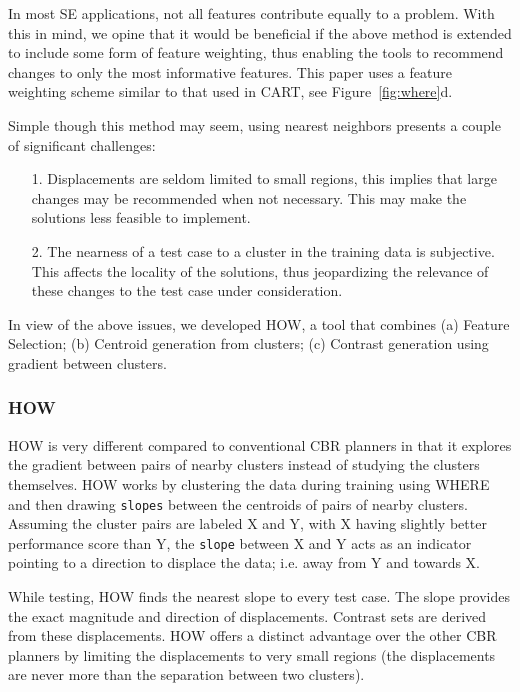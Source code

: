 \documentclass{sig-alternate}
\newcommand{\fig}[1]{Figure~\ref{fig:#1}}
\begin{document}
In most SE applications, not all features contribute equally to a problem. With this in mind, we opine that it would be beneficial if the above method is extended to include some form of feature weighting, thus enabling the tools to recommend changes to only the most informative features. This paper uses a feature weighting scheme similar to that used in CART, see \fig{where}d.

Simple though this method may seem, using nearest neighbors presents a couple of significant challenges: 
\begin{itemize}
\item[1.] Displacements are seldom limited to small regions, this implies that large changes may be recommended when not necessary. This may make the solutions less feasible to implement. 
\item[2.] The nearness of a test case to a cluster in the training data is subjective. This affects the locality of the solutions, thus jeopardizing the relevance of these changes to the test case under consideration.
\end{itemize}

In view of the above issues, we developed HOW, a tool that combines (a) Feature Selection; (b) Centroid generation from clusters; (c) Contrast generation using gradient between clusters.

\subsubsection{HOW}

HOW is very different compared to conventional CBR planners in that it explores the gradient between pairs of nearby clusters instead of studying the clusters themselves. HOW works by clustering the data during training using WHERE and then drawing \texttt{slopes} between the centroids of pairs of nearby clusters. Assuming the cluster pairs are labeled X and Y, with X having slightly better performance score than Y, the \texttt{slope} between X and Y acts as an indicator pointing to a direction to displace the data; i.e. away from Y and towards X. 

While testing, HOW finds the nearest slope to every test case. The slope provides the exact magnitude and direction of displacements. Contrast sets are derived from these displacements. HOW offers a distinct advantage over the other CBR planners by limiting the displacements to very small regions (the displacements are never more than the separation between two clusters). 
\end{document}
